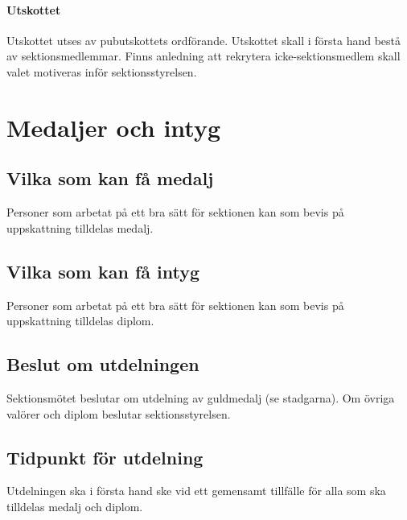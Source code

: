 \documentclass{datateknologsektionen-document}
\begin{document}
\paragraph{Utskottet}
Utskottet utses av pubutskottets ordförande. Utskottet skall i första hand bestå av
sektionsmedlemmar. Finns anledning att rekrytera icke-sektionsmedlem skall valet
motiveras inför sektionsstyrelsen.
\section{Medaljer och intyg}
\subsection{Vilka som kan få medalj}
Personer som arbetat på ett bra sätt för sektionen kan som bevis på uppskattning tilldelas medalj.
\subsection{Vilka som kan få intyg}
Personer som arbetat på ett bra sätt för sektionen kan som bevis på uppskattning tilldelas diplom.
\subsection{Beslut om utdelningen}
Sektionsmötet beslutar om utdelning av guldmedalj (se stadgarna). Om övriga valörer och diplom
beslutar sektionsstyrelsen.
\subsection{Tidpunkt för utdelning}
Utdelningen ska i första hand ske vid ett gemensamt tillfälle för alla som ska tilldelas medalj och
diplom.
\end{document}
